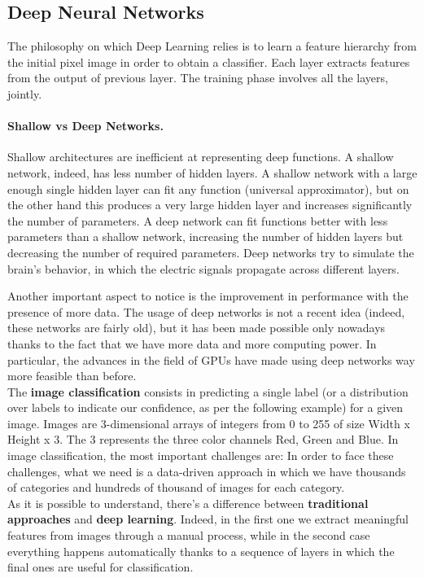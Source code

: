 \subsection{Deep Neural Networks}
The philosophy on which Deep Learning relies is to learn a feature hierarchy from the initial pixel image in order to obtain a classifier. Each layer extracts features from the output of previous layer. The training phase involves all the layers, jointly.

\paragraph*{Shallow vs Deep Networks.} Shallow architectures are inefficient at representing deep functions. A shallow network, indeed, has less number of hidden layers. A shallow network with a large enough single hidden layer can fit any function (universal approximator), but on the other hand this produces a very large hidden layer and increases significantly the number of parameters. A deep network can fit functions better with less parameters than a shallow network, increasing the number of hidden layers but decreasing the number of required parameters. Deep networks try to simulate the brain's behavior, in which the electric signals propagate across different layers.

Another important aspect to notice is the improvement in performance with the presence of more data.
The usage of deep networks is not a recent idea (indeed, these networks are fairly old), but it has been made possible only nowadays thanks to the fact that we have more data and more computing power. In particular, the advances in the field of GPUs have made using deep networks way more feasible than before.\\
The \textbf{image classification} consists in predicting a single label (or a distribution over labels to indicate our confidence, as per the following example) for a given image. Images are 3-dimensional arrays of integers from 0 to 255 of size Width x Height x 3. The 3 represents the three color channels Red, Green and Blue.
In image classification, the most important challenges are:
In order to face these challenges, what we need is a data-driven approach in which we have thousands of categories and hundreds of thousand of images for each category.\\
As it is possible to understand, there's a difference between \textbf{traditional approaches} and \textbf{deep learning}. Indeed, in the first one we extract meaningful features from images through a manual process, while in the second case everything happens automatically thanks to a sequence of layers in which the final ones are useful for classification.

